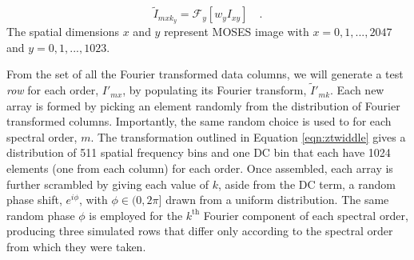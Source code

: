 		\begin{equation}
			\widetilde{I}_{mxk_y} = \mathcal{F}_y\left[ w_yI_{xy}\right]\quad.
			\label{eqn:ztwiddle}
		\end{equation}
   		The spatial dimensions $x$ and $y$ represent MOSES image with $ x = 0,1,...,2047$ and $y = 0,1,...,1023$.
	
		From the set of all the Fourier transformed data columns, we will generate a test \emph{row} for each order, $I'_{mx}$, by populating its Fourier transform, $\widetilde{I}'_{mk}$. 
		Each new array is formed by picking an element randomly from the distribution of Fourier transformed columns.
		Importantly, the same random choice is used to for each spectral order, $m$.
		The transformation outlined in Equation \ref{eqn:ztwiddle}
		gives a distribution of 511 spatial frequency bins and one DC bin that each have 1024 elements (one from each column) for each order. 
		Once assembled, each array is further scrambled by giving each value of $k$, aside from the DC term, a random phase shift, $e^{i\phi}$, with $\phi \in (0, 2\pi]$ drawn from a uniform distribution. 
		The same random phase $\phi$ is employed for the $k^{\text{th}}$ Fourier component of each spectral order, producing three simulated rows that differ only according to the spectral order from which they were taken. 
		
		
		
		

